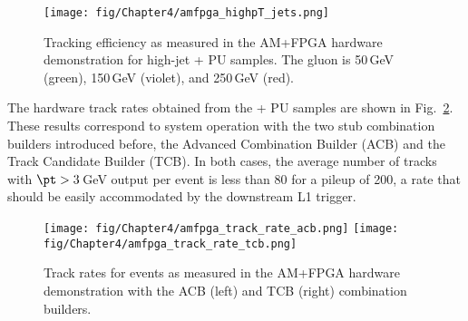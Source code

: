 \begin{figure}[t]
  \centering
\texttt{[image: fig/Chapter4/amfpga\_highpT\_jets.png]}
  \caption{Tracking efficiency as measured in the AM+FPGA hardware demonstration for high-\pt jet + PU samples. The gluon \pt is 50\,GeV (green), 150\,GeV (violet), and 250\,GeV (red).} 
  \label{fig:AM_highpT_jets}
\end{figure}

The hardware track rates obtained from the \ttbar + PU samples are shown in Fig.~\ref{fig:AM_rate}. These results correspond to system operation with the two stub combination builders introduced before, the Advanced Combination Builder (ACB) and the Track Candidate Builder (TCB). In both cases, the average number of tracks with $\pt > 3$\,GeV output per event is less than 80 for a pileup of 200, a rate that should be easily accommodated by the downstream L1 trigger.

\begin{figure}[t]
  \centering
\texttt{[image: fig/Chapter4/amfpga\_track\_rate\_acb.png]}
\hfill
\texttt{[image: fig/Chapter4/amfpga\_track\_rate\_tcb.png]}
  \caption{Track rates for \ttbar events as measured in the AM+FPGA hardware demonstration with the ACB (left) and TCB (right) combination builders.} 
  \label{fig:AM_rate}
\end{figure}
